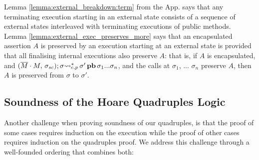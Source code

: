 Lemma \ref{lemma:external_breakdown:term} from  the  App.   says that any terminating execution
 starting in an external state  consists of a  sequence of  external states interleaved with terminating executions
of public methods.
Lemma  \ref{lemma:external_exec_preserves_more} says that an encapsulated assertion $A$  is preserved by an execution
starting at an external state is provided that all finalising internal executions  %
also preserve $A$: that is, if $A$ is encapsulated, 
 and $(\overline{M}\cdot M,\, {\sigma_{sc}}); \sigma {{\rightsquigarrow^*}} \!\!\!_{e,p}\, \sigma'\, {\textbf{pb}}\, {\sigma_1...\sigma_n}$, and 
 the calls at  $\sigma_1$, ... $\sigma_n$ preserve $A$,  then $A$ is preserved from $\sigma$ to $\sigma'$.  
% 
  



\subsection{ Soundness of the Hoare Quadruples Logic}

Another challenge when proving soundness of our quadruples, is that the proof of some cases  requires induction on the execution while the proof of other cases  requires induction on the quadruples
proof.  We address this challenge  through  a well-founded ordering that combines both:


